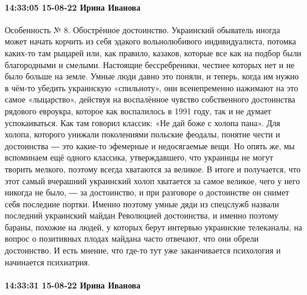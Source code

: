 \paragraph{14:33:05 15-08-22 Ирина Иванова}

Особенность № 8. Обострённое достоинство. Украинский обыватель иногда может
начать корчить из себя эдакого вольнолюбивого индивидуалиста, потомка каких-то
там рыцарей или, как правило, казаков, которые все как на подбор были
благородными и смелыми. Настоящие бессребреники, честнее которых нет и не было
больше на земле. Умные люди давно это поняли, и теперь, когда им нужно в чём-то
убедить украинскую «спильноту», они всенепременно нажимают на это самое
«лыцарство», действуя на воспалённое чувство собственного достоинства рядового
евроукра, которое как воспалилось в 1991 году, так и не думает успокаиваться.
Как там говорил классик: «Не дай боже с холопа пана». Для холопа, которого
унижали поколениями польские феодалы, понятие чести и достоинства ― это
какие-то эфемерные и недосягаемые вещи. Но опять же, мы вспоминаем ещё одного
классика, утверждавшего, что украинцы не могут творить мелкого, поэтому всегда
хватаются за великое. В итоге и получается, что этот самый вчерашний украинский
холоп хватается за самое великое, чего у него никогда не было, ― за
достоинство, и при разговоре о достоинстве он снимет себя последние портки.
Именно поэтому умные дяди из спецслужб назвали последний украинский майдан
Революцией достоинства, и именно поэтому бараны, похожие на людей, у которых
берут интервью украинские телеканалы, на вопрос о позитивных плодах майдана
часто отвечают, что они обрели достоинство. И есть мнение, что где-то тут уже
заканчивается психология и начинается психиатрия.

\paragraph{14:33:31 15-08-22 Ирина Иванова}

